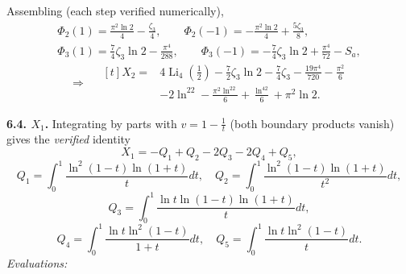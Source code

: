 \documentclass[11pt]{article}
\theoremstyle{remark}
\begin{document}
Assembling (each step verified numerically),
\[
\begin{gathered}
\Phi_2(1)=\frac{\pi^2\ln2}{4}-\frac{\zeta_3}{4},\qquad
\Phi_2(-1)=-\frac{\pi^2\ln2}{4}+\frac{5\zeta_3}{8},\\
\Phi_3(1)=\frac74\zeta_3\ln2-\frac{\pi^4}{288},\qquad
\Phi_3(-1)=-\frac74\zeta_3\ln2+\frac{\pi^4}{72}-S_a,
\end{gathered}
\]
\[
\Longrightarrow\quad
\begin{aligned}[t]
X_2={}&4\operatorname{Li}_4(\tfrac12)-\frac72\zeta_3\ln2-\frac74\zeta_3-\frac{19\pi^4}{720}-\frac{\pi^2}{6}\\
&-2\ln^22-\frac{\pi^2\ln^22}{6}+\frac{\ln^42}{6}+\pi^2\ln2 .
\end{aligned}
\]

\textbf{6.4. $X_1$.} Integrating by parts with $v=1-\tfrac1t$ (both boundary products vanish) gives the \textit{verified} identity
\[
X_1=-Q_1+Q_2-2Q_3-2Q_4+Q_5,
\]
\[
Q_1=\int_0^1\frac{\ln^2(1-t)\ln(1+t)}{t}dt,\quad
Q_2=\int_0^1\frac{\ln^2(1-t)\ln(1+t)}{t^2}dt,
\]
\[
Q_3=\int_0^1\frac{\ln t\ln(1-t)\ln(1+t)}{t}dt,
\]
\[
Q_4=\int_0^1\frac{\ln t\ln^2(1-t)}{1+t}dt,\quad
Q_5=\int_0^1\frac{\ln t\ln^2(1-t)}{t}dt .
\]
\textit{Evaluations:}
\end{document}
